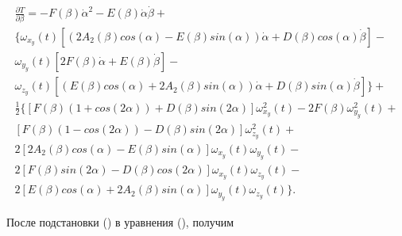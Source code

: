 \begin{equation}%
\label{eq:p3:45}
\begin{multlined}
\frac{ \partial T}{ \partial \beta }=-F \left( \beta \right) \dot \alpha ^{2}-E \left( \beta \right) \dot \alpha \dot \beta +\\ 
\{ 
	\omega _{x_{y}} 
		\left( t \right) \left[ \left( 2A_{2} \left( \beta \right) cos \left( \alpha \right) -E \left( \beta \right) sin \left( \alpha \right) \right) \dot \alpha +
		D \left( \beta \right) cos \left( \alpha \right) \dot \beta \right] - \\
 	\omega _{y_{y}} 
 		\left( t \right) \left[ 2F \left( \beta \right) \dot \alpha +E \left( \beta \right) \dot \beta \right] - \\
 	\omega_{z_{y}} 
 		\left( t \right) \left[ \left( E \left( \beta \right) cos \left( \alpha \right) +2A_{2} \left( \beta \right) sin \left( \alpha \right) \right) \dot \alpha +
 		D \left( \beta \right) sin \left( \alpha \right) \dot \beta \right] 
\} +\\ 
\frac{1}{2} 
\{ 
	\left[ 
		F \left( \beta \right) \left( 1+cos \left( 2 \alpha \right) \right) +D \left( \beta \right) sin \left( 2 \alpha \right) \right] \omega _{x_{y}}^{2} \left( t \right) -2F \left( \beta \right) \omega _{y_{y}}^{2} \left( t \right) + \\ 
	\left[ 
		F \left( \beta \right) \left( 1-cos \left( 2 \alpha \right) \right) -D \left( \beta \right) sin \left( 2 \alpha \right) \right] \omega _{z_{y}}^{2} \left( t \right) +\\
	2 \left[ 
		2A_{2} \left( \beta \right) cos \left( \alpha \right) -E \left( \beta \right) sin \left( \alpha \right) \right] \omega _{x_{y}} \left( t \right) \omega _{y_{y}} \left( t \right) -\\
	2 \left[ 
		F \left( \beta \right) sin \left( 2 \alpha \right) -D \left( \beta \right) cos \left( 2 \alpha \right) \right] \omega _{x_{y}} \left( t \right) \omega _{z_{y}} \left( t \right) -\\
	2 \left[ 
		E \left( \beta \right) cos \left( \alpha \right) +2A_{2} \left( \beta \right) sin \left( \alpha \right) \right] \omega _{y_{y}} \left( t \right) \omega _{z_{y}} \left( t \right) 
\} .
\end{multlined}
\end{equation}


После подстановки () в уравнения (), получим


